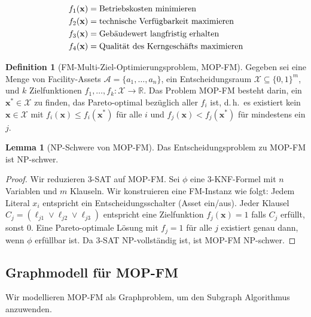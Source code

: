 ﻿\documentclass[a4paper,12pt]{article}
\theoremstyle{definition}
\newtheorem{definition}{Definition}[section]
\newtheorem{lemma}{Lemma}[section]
\begin{document}
\begin{align}
    f_1(\mathbf{x}) &= \text{Betriebskosten minimieren} \notag \\
    f_2(\mathbf{x}) &= \text{technische Verfügbarkeit maximieren} \notag \\
    f_3(\mathbf{x}) &= \text{Gebäudewert langfristig erhalten} \notag \\
    f_4(\mathbf{x}) &= \text{Qualität des Kerngeschäfts maximieren} \notag
\end{align}

\begin{definition}[FM-Multi-Ziel-Optimierungsproblem, MOP-FM]
\label{def:mopfm}
Gegeben sei eine Menge von Facility-Assets $\mathcal{A} = \{a_1, \ldots, a_n\}$,
ein Entscheidungsraum $\mathcal{X} \subseteq \{0,1\}^m$, und $k$ Zielfunktionen
$f_1, \ldots, f_k : \mathcal{X} \to \mathbb{R}$.
Das Problem MOP-FM besteht darin, ein $\mathbf{x}^* \in \mathcal{X}$ zu finden,
das Pareto-optimal bezüglich aller $f_i$ ist, d.\,h.\ es existiert kein
$\mathbf{x} \in \mathcal{X}$ mit $f_i(\mathbf{x}) \leq f_i(\mathbf{x}^*)$ für alle $i$
und $f_j(\mathbf{x}) < f_j(\mathbf{x}^*)$ für mindestens ein $j$.
\end{definition}

\begin{lemma}[NP-Schwere von MOP-FM]
\label{lem:mop-np}
Das Entscheidungsproblem zu MOP-FM ist NP-schwer.
\end{lemma}

\begin{proof}
Wir reduzieren 3-SAT auf MOP-FM. Sei $\phi$ eine 3-KNF-Formel mit $n$ Variablen
und $m$ Klauseln. Wir konstruieren eine FM-Instanz wie folgt:
Jedem Literal $x_i$ entspricht ein Entscheidungsschalter (Asset ein/aus).
Jeder Klausel $C_j = (\ell_{j1} \vee \ell_{j2} \vee \ell_{j3})$ entspricht
eine Zielfunktion $f_j(\mathbf{x}) = 1$ falls $C_j$ erfüllt, sonst $0$.
Eine Pareto-optimale Lösung mit $f_j = 1$ für alle $j$ existiert genau dann,
wenn $\phi$ erfüllbar ist. Da 3-SAT NP-vollständig ist, ist MOP-FM NP-schwer.
\end{proof}

\subsection{Graphmodell für MOP-FM}

Wir modellieren MOP-FM als Graphproblem, um den Subgraph Algorithmus anzuwenden.
\end{document}
